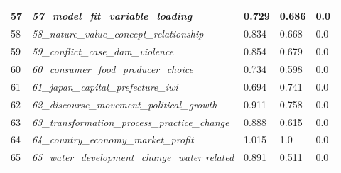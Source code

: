 \documentclass[12pt]{article}
\begin{document}
\begin{longtable}{|l|l|l|l|l|}
57 & \textit{57\_model\_fit\_variable\_loading} & 0.729 & 0.686 & 0.0 \\ \hline
58 & \textit{58\_nature\_value\_concept\_relationship} & 0.834 & 0.668 & 0.0 \\ \hline
59 & \textit{59\_conflict\_case\_dam\_violence} & 0.854 & 0.679 & 0.0 \\ \hline
60 & \textit{60\_consumer\_food\_producer\_choice} & 0.734 & 0.598 & 0.0 \\ \hline
61 & \textit{61\_japan\_capital\_prefecture\_iwi} & 0.694 & 0.741 & 0.0 \\ \hline
62 & \textit{62\_discourse\_movement\_political\_growth} & 0.911 & 0.758 & 0.0 \\ \hline
63 & \textit{63\_transformation\_process\_practice\_change} & 0.888 & 0.615 & 0.0 \\ \hline
64 & \textit{64\_country\_economy\_market\_profit} & 1.015 & 1.0 & 0.0 \\ \hline
65 & \textit{65\_water\_development\_change\_water related} & 0.891 & 0.511 & 0.0 \\ \hline
\end{longtable}
\end{document}
